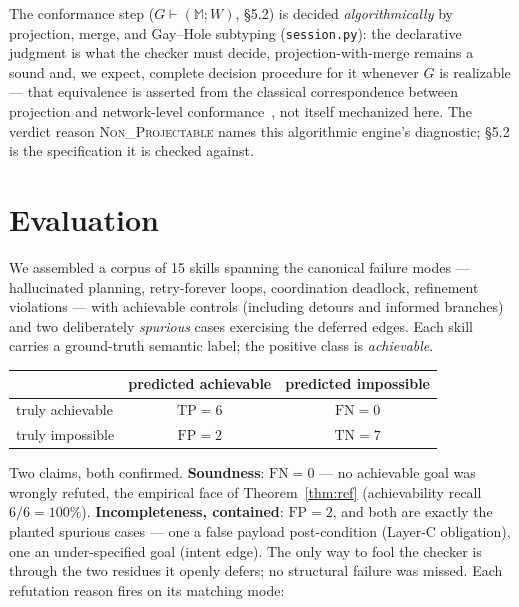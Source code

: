 \documentclass[11pt]{article}
\theoremstyle{plain}
\theoremstyle{definition}
\newcommand{\id}[1]{\texttt{#1}}
\newcommand{\MM}{\mathbb{M}}
\begin{document}
The conformance step ($G\vdash(\MM;W)$, \S5.2) is decided \emph{algorithmically}
by projection, merge, and Gay--Hole subtyping (\id{session.py}): the declarative
judgment is what the checker must decide, projection-with-merge remains a sound
and, we expect, complete decision procedure for it whenever $G$ is realizable ---
that equivalence is asserted from the classical correspondence between
projection and network-level conformance~\cite{honda,yoshidagheri}, not itself
mechanized here. The verdict reason \textsc{Non\_Projectable} names this
algorithmic engine's diagnostic; \S5.2 is the specification it is checked
against.

\section{Evaluation}
We assembled a corpus of 15 skills spanning the canonical failure modes ---
hallucinated planning, retry-forever loops, coordination deadlock, refinement
violations --- with achievable controls (including detours and informed branches)
and two deliberately \emph{spurious} cases exercising the deferred edges. Each
skill carries a ground-truth semantic label; the positive class is
\emph{achievable}.

\begin{center}\small
\begin{tabular}{@{}lcc@{}}
\toprule
 & predicted achievable & predicted impossible\\
\midrule
truly achievable & $\mathrm{TP}=6$ & $\mathrm{FN}=0$\\
truly impossible & $\mathrm{FP}=2$ & $\mathrm{TN}=7$\\
\bottomrule
\end{tabular}
\end{center}

\noindent Two claims, both confirmed. \textbf{Soundness}: $\mathrm{FN}=0$ --- no
achievable goal was wrongly refuted, the empirical face of Theorem~\ref{thm:ref}
(achievability recall $6/6=100\%$). \textbf{Incompleteness, contained}:
$\mathrm{FP}=2$, and both are exactly the planted spurious cases --- one a false
payload post-condition (Layer-C obligation), one an under-specified goal (intent
edge). The only way to fool the checker is through the two residues it openly
defers; no structural failure was missed. Each refutation reason fires on its
matching mode:
\end{document}
